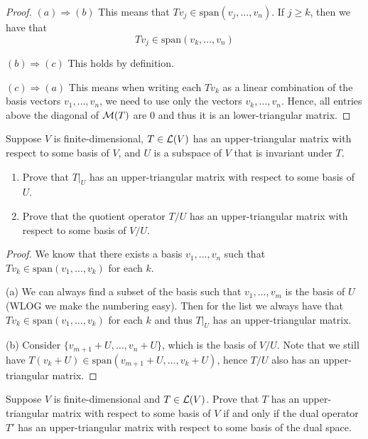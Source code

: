 \documentclass{extarticle}
\begin{document}
\begin{proof}
\((a) \Rightarrow (b)\) This means that \(Tv_j \in \text{span}(v_j, \ldots, v_n)\). If \(j \geq k\), then 
we have that 
\[T v_j \in \text{span}(v_k, \ldots, v_n)\]

\((b) \Rightarrow (c)\) This holds by definition. 

\((c) \Rightarrow (a)\) This means when writing each \(Tv_k\) as a linear combination of the basis vectors 
\(v_1, \ldots, v_n\), we need to use only the vectors \(v_k, \ldots, v_n\). Hence, all entries above the 
diagonal of \(\mathcal{M}(T)\) are 0 and thus it is an lower-triangular matrix.
\end{proof}

\begin{problem}{12}
    Suppose \(V\) is finite-dimensional, \(T \in \mathcal{L}(V)\) has an upper-triangular matrix with respect 
    to some basis of \(V\), and \(U\) is a subspace of \(V\) that is invariant under \(T\). 
    \begin{enumerate}[label=(\alph*)]
        \item Prove that \(T|_U\) has an upper-triangular matrix with respect to some basis of \(U\). 
        \item Prove that the quotient operator \(T/U\) has an upper-triangular matrix with respect 
        to some basis of \(V/U\).
    \end{enumerate}
\end{problem}

\begin{proof} We know that there exists a basis \(v_1, \ldots, v_n\) 
    such that \(T v_k \in \text{span}(v_1, \ldots, v_k)\) for each \(k\). 

(a) We can always find a subset of the basis such that \(v_1, \ldots, v_m\) is the basis of 
\(U\) (WLOG we make the numbering easy). Then for the list we always have that \(T v_k \in 
\text{span}(v_1, \ldots, v_k)\) for each \(k\) and thus \(T|_U\) has an upper-triangular matrix. 

(b) Consider \(\{v_{m+1} + U, \ldots, v_n + U\}\), which is the basis of \(V/U\). Note that 
we still have \(T(v_k + U) \in \text{span}(v_{m+1} + U, \ldots, v_{k} +U)\), hence \(T/U\) 
also has an upper-triangular matrix. 
\end{proof}

\begin{problem}{14}
    Suppose \(V\) is finite-dimensional and \(T \in \mathcal{L}(V)\). Prove that \(T\) has an upper-triangular 
    matrix with respect to some basis of \(V\) if and only if the dual operator \(T'\) has an upper-triangular 
    matrix with respect to some basis of the dual space. 
\end{problem}
\end{document}
